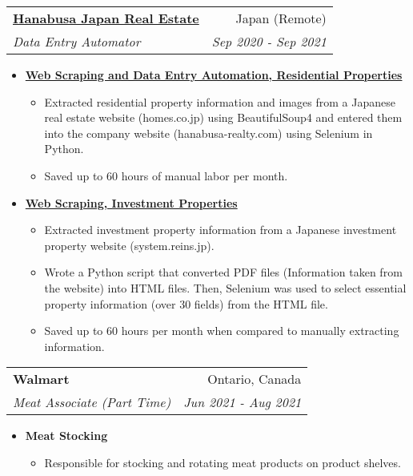 \documentclass[letterpaper,11pt]{article}
\makeatletter
\newcommand{\resumeItem}[2]{
  \item\small{
    \textbf{#1}{ #2 \vspace{3pt}}
  }
}
\newcommand{\resumeSubheading}[4]{
  \vspace{-1pt}\item
    \begin{tabular*}{0.97\textwidth}{l@{\extracolsep{\fill}}r}
      \textbf{#1} & #2 \\
      \textit{\small#3} & \textit{\small #4} \\
    \end{tabular*}\vspace{0pt}
}
\newcommand{\resumeItemListStart}{\begin{itemize}}
\newcommand{\resumeItemListEnd}{\end{itemize}\vspace{0pt}}
\makeatother
\begin{document}
\resumeSubheading
{\href{https://hanabusa-realty.com/}{Hanabusa Japan Real Estate}}{Japan (Remote)}
{Data Entry Automator}{Sep 2020 - Sep 2021}
\resumeItemListStart
\resumeItem{\href{https://github.com/pl3lee/Hanabusa-Automation}{Web Scraping and Data Entry Automation, Residential Properties}}
{\begin{itemize}
		\item Extracted residential property information and images from a Japanese real estate website (homes.co.jp) using BeautifulSoup4 and entered them into the company website (hanabusa-realty.com) using Selenium in Python.
		\item Saved up to 60 hours of manual labor per month.
	\end{itemize}}
\resumeItem{\href{https://github.com/pl3lee/Reins-Automation}{Web Scraping, Investment Properties}}
{\begin{itemize}
		\item Extracted investment property information from a Japanese investment property website (system.reins.jp).
		\item Wrote a Python script that converted PDF files (Information taken from the website) into HTML files. Then, Selenium was used to select essential property information (over 30 fields) from the HTML file.
		\item Saved up to 60 hours per month when compared to manually extracting information.
	\end{itemize}}
\resumeItemListEnd

\resumeSubheading
{Walmart}{Ontario, Canada}
{Meat Associate (Part Time)}{Jun 2021 - Aug 2021}
\resumeItemListStart
\resumeItem{Meat Stocking}
{\begin{itemize}
		\item Responsible for stocking and rotating meat products on product shelves.
	\end{itemize}}
\resumeItemListEnd
\end{document}
